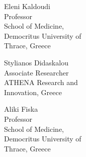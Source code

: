 \begin{center}
\begin{minipage}[t]{0.24\textwidth}
    \centering \scriptsize
    Eleni Kaldoudi\\
    Professor\\
    School of Medicine,\\
    Democritus University of\\
    Thrace, Greece
\end{minipage}
\begin{minipage}[t]{0.24\textwidth}
    \centering \scriptsize
    Stylianos Didaskalou\\
    Associate Researcher\\
    ATHENA Research and\\
    Innovation, Greece
\end{minipage}
\begin{minipage}[t]{0.24\textwidth}
    \centering \scriptsize
    Aliki Fiska\\
    Professor\\
    School of Medicine,\\
    Democritus University of\\
    Thrace, Greece
\end{minipage}

\end{center}

